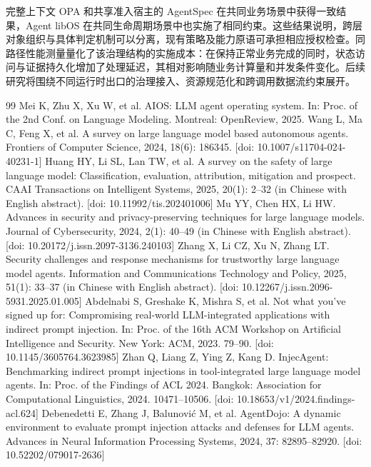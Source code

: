 完整上下文 OPA 和共享准入宿主的 AgentSpec 在共同业务场景中获得一致结果，Agent libOS 在共同生命周期场景中也实施了相同约束。这些结果说明，跨层对象组织与具体判定机制可以分离，现有策略及能力原语可承担相应授权检查。同路径性能测量量化了该治理结构的实施成本：在保持正常业务完成的同时，状态访问与证据持久化增加了处理延迟，其相对影响随业务计算量和并发条件变化。后续研究将围绕不同运行时出口的治理接入、资源规范化和跨调用数据流约束展开。

{\small
\begin{thebibliography}{99}
 Mei K, Zhu X, Xu W, et al. AIOS: LLM agent operating system. In: Proc. of the 2nd Conf. on Language Modeling. Montreal: OpenReview, 2025.
 Wang L, Ma C, Feng X, et al. A survey on large language model based autonomous agents. Frontiers of Computer Science, 2024, 18(6): 186345. [doi: 10.1007/s11704-024-40231-1]
 Huang HY, Li SL, Lan TW, et al. A survey on the safety of large language model: Classification, evaluation, attribution, mitigation and prospect. CAAI Transactions on Intelligent Systems, 2025, 20(1): 2--32 (in Chinese with English abstract). [doi: 10.11992/tis.202401006]
 Mu YY, Chen HX, Li HW. Advances in security and privacy-preserving techniques for large language models. Journal of Cybersecurity, 2024, 2(1): 40--49 (in Chinese with English abstract). [doi: 10.20172/j.issn.2097-3136.240103]
 Zhang X, Li CZ, Xu N, Zhang LT. Security challenges and response mechanisms for trustworthy large language model agents. Information and Communications Technology and Policy, 2025, 51(1): 33--37 (in Chinese with English abstract). [doi: 10.12267/j.issn.2096-5931.2025.01.005]
 Abdelnabi S, Greshake K, Mishra S, et al. Not what you've signed up for: Compromising real-world LLM-integrated applications with indirect prompt injection. In: Proc. of the 16th ACM Workshop on Artificial Intelligence and Security. New York: ACM, 2023. 79--90. [doi: 10.1145/3605764.3623985]
 Zhan Q, Liang Z, Ying Z, Kang D. InjecAgent: Benchmarking indirect prompt injections in tool-integrated large language model agents. In: Proc. of the Findings of ACL 2024. Bangkok: Association for Computational Linguistics, 2024. 10471--10506. [doi: 10.18653/v1/2024.findings-acl.624]
 Debenedetti E, Zhang J, Balunovi\'{c} M, et al. AgentDojo: A dynamic environment to evaluate prompt injection attacks and defenses for LLM agents. Advances in Neural Information Processing Systems, 2024, 37: 82895--82920. [doi: 10.52202/079017-2636]

\end{thebibliography}}
